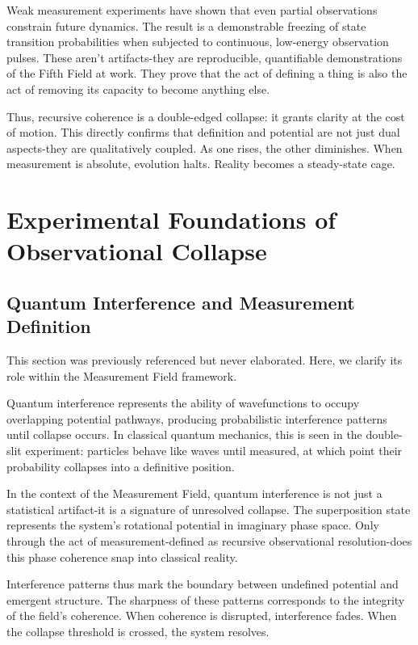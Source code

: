 Weak measurement experiments have shown that even partial observations constrain future dynamics. The result is a demonstrable freezing of state transition probabilities when subjected to continuous, low-energy observation pulses. These aren’t artifacts-they are reproducible, quantifiable demonstrations of the Fifth Field at work. They prove that the act of defining a thing is also the act of removing its capacity to become anything else.

Thus, recursive coherence is a double-edged collapse: it grants clarity at the cost of motion. This directly confirms that definition and potential are not just dual aspects-they are qualitatively coupled. As one rises, the other diminishes. When measurement is absolute, evolution halts. Reality becomes a steady-state cage.

\section{Experimental Foundations of Observational Collapse}

\subsection{Quantum Interference and Measurement Definition}

This section was previously referenced but never elaborated. Here, we clarify its role within the Measurement Field framework.

Quantum interference represents the ability of wavefunctions to occupy overlapping potential pathways, producing probabilistic interference patterns until collapse occurs. In classical quantum mechanics, this is seen in the double-slit experiment: particles behave like waves until measured, at which point their probability collapses into a definitive position.

In the context of the Measurement Field, quantum interference is not just a statistical artifact-it is a signature of unresolved collapse. The superposition state represents the system's rotational potential in imaginary phase space. Only through the act of measurement-defined as recursive observational resolution-does this phase coherence snap into classical reality.

Interference patterns thus mark the boundary between undefined potential and emergent structure. The sharpness of these patterns corresponds to the integrity of the field's coherence. When coherence is disrupted, interference fades. When the collapse threshold is crossed, the system resolves.

